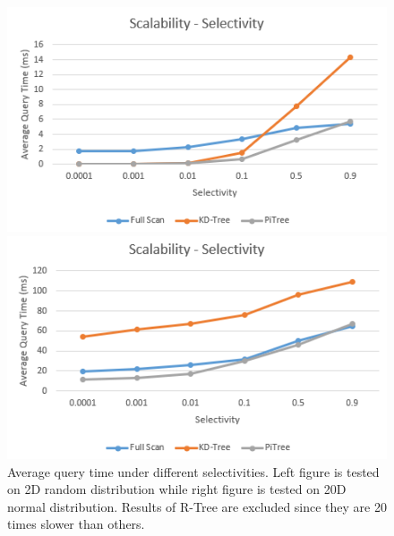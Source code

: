 \documentclass[sigconf,10pt]{acmart}
\begin{document}
\begin{figure}[t] 
  \label{scalability-selectivity} 
  \begin{minipage}[b]{0.45\linewidth}
    \centering
    \includegraphics[width=.8\linewidth]{../figures/scalability/selectivity-random} 
    \vspace{4ex}
  \end{minipage}%
  \begin{minipage}[b]{0.45\linewidth}
    \centering
    \includegraphics[width=.8\linewidth]{../figures/scalability/selectivity-normal} 
    \vspace{4ex}
  \end{minipage}%
  \caption{Average query time under different selectivities. Left figure is tested
  on 2D random distribution while right figure is tested on 20D normal distribution.
  Results of R-Tree are excluded since they are 20 times slower than others.}
\end{figure}
\end{document}

